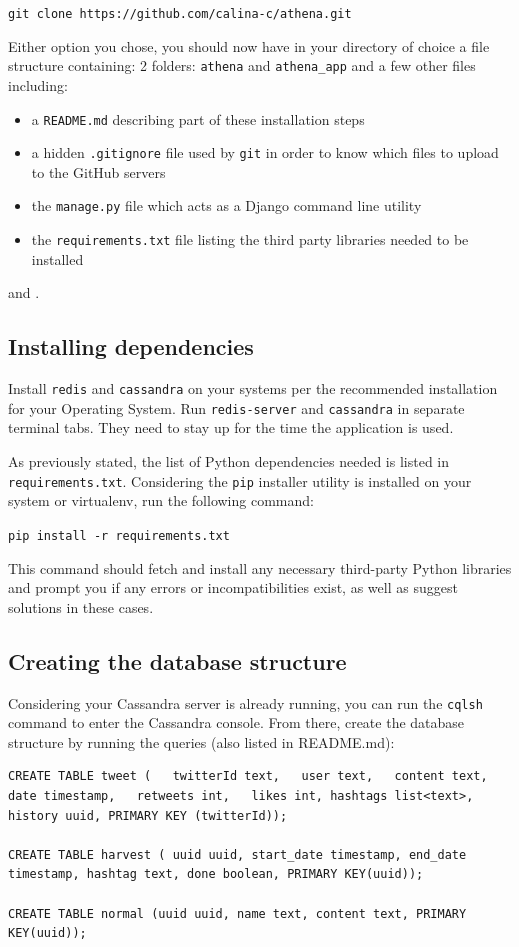 \documentclass[12pt,a4paper,twoside]{report}
\begin{document}
\texttt{git clone https://github.com/calina-c/athena.git}

Either option you chose, you should now have in your directory of choice a file structure containing: 2 folders: \texttt{athena} and \texttt{athena\_app} and a few other files including:

\begin{itemize}
\item a \texttt{README.md} describing part of these installation steps
\item a hidden \texttt{.gitignore} file used by \texttt{git} in order to know which files to upload to the GitHub servers
\item  the \texttt{manage.py} file which acts as a Django command line utility
\item the \texttt{requirements.txt} file listing the third party libraries needed to be installed
\end{itemize}  and .

\subsection*{Installing dependencies}
Install \texttt{redis} and \texttt{cassandra} on your systems per the recommended installation for your Operating System. Run \texttt{redis-server} and \texttt{cassandra} in separate terminal tabs. They need to stay up for the time the application is used.

As previously stated, the list of Python dependencies needed is listed in \texttt{requirements.txt}. Considering the \texttt{pip} installer utility is installed on your system or virtualenv, run the following command:

\texttt{pip install -r requirements.txt}

This command should fetch and install any necessary third-party Python libraries and prompt you if any errors or incompatibilities exist, as well as suggest solutions in these cases.

\subsection*{Creating the database structure}
Considering your Cassandra server is already running, you can run the \texttt{cqlsh} command to enter the Cassandra console. From there, create the database structure by running the queries (also listed in README.md):

\begin{lstlisting}
CREATE TABLE tweet (   twitterId text,   user text,   content text,   date timestamp,   retweets int,   likes int, hashtags list<text>, history uuid, PRIMARY KEY (twitterId));

CREATE TABLE harvest ( uuid uuid, start_date timestamp, end_date timestamp, hashtag text, done boolean, PRIMARY KEY(uuid));

CREATE TABLE normal (uuid uuid, name text, content text, PRIMARY KEY(uuid));
\end{lstlisting}
\end{document}
